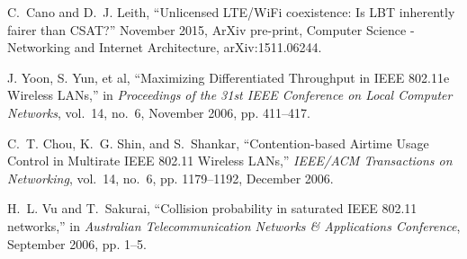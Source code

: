 \begin{thebibliography}{99.}
	 C.~Cano and D.~J. Leith, ``{Unlicensed LTE/WiFi coexistence: Is LBT inherently fairer than CSAT?}'' November 2015, {ArXiv pre-print, Computer Science - Networking and Internet Architecture, arXiv:1511.06244}.
	
	 {J. Yoon, S. Yun, et al}, ``{Maximizing Differentiated Throughput in IEEE 802.11e Wireless LANs},'' in \emph{{ Proceedings of the 31st IEEE Conference on Local Computer Networks}}, vol.~14, no.~6, November 2006, pp. 411--417.
	
	 C.~T. Chou, K.~G. Shin, and S.~Shankar, ``{Contention-based Airtime Usage Control in Multirate IEEE 802.11 Wireless LANs},'' \emph{{IEEE/ACM Transactions on Networking}}, vol.~14, no.~6, pp. 1179--1192, December 2006.
	
	 H.~L. Vu and T.~Sakurai, ``{Collision probability in saturated IEEE 802.11 networks},'' in \emph{{Australian Telecommunication Networks \& Applications Conference}}, September 2006, pp. 1--5.
\end{thebibliography}
